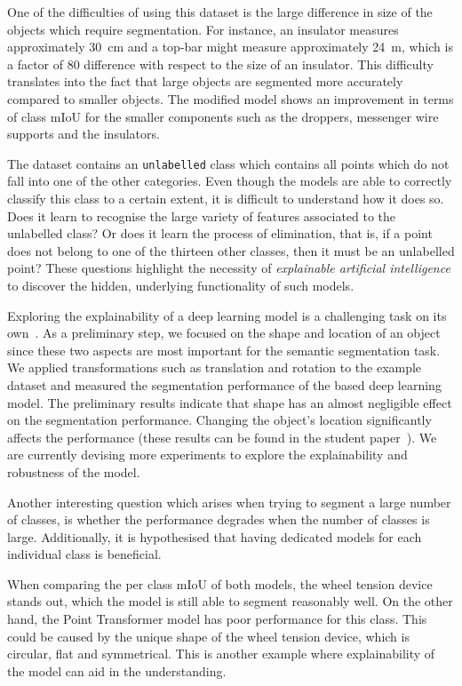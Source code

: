 One of the difficulties of using this dataset is the large difference in size of the objects which require segmentation. For instance, an insulator measures approximately 30~cm and a top-bar might measure approximately 24~m, which is a factor of 80 difference with respect to the size of an insulator. This difficulty translates into the fact that large objects are segmented more accurately compared to smaller objects. The modified \pnpp{} model shows an improvement in terms of class mIoU for the smaller components such as the droppers, messenger wire supports and the insulators. 

The dataset contains an \texttt{unlabelled} class which contains all points which do not fall into one of the other categories. Even though the models are able to correctly classify this class to a certain extent, it is difficult to understand how it does so. Does it learn to recognise the large variety of features associated to the unlabelled class? Or does it learn the process of elimination, that is, if a point does not belong to one of the thirteen other classes, then it must be an unlabelled point? These questions highlight the necessity of \emph{explainable artificial intelligence}\cite{Samek2019} to discover the hidden, underlying functionality of such models.

Exploring the explainability of a deep learning model is a challenging task on its own~\cite{linardatos2021explainable,pan20,pointhop20,bubbleEx22}. As a preliminary step, we focused on the shape and location of an object since these two aspects are most important for the semantic segmentation task. We applied transformations such as translation and rotation to the example dataset and measured the segmentation performance of the \pnpp{} based deep learning model. The preliminary results indicate that shape has an almost negligible effect on the segmentation performance. Changing the object's location significantly affects the performance (these results can be found in the student paper~\cite{verburg2022exploring}). We are currently devising more experiments to explore the explainability and robustness of the model. 

Another interesting question which arises when trying to segment a large number of classes, is whether the performance degrades when the number of classes is large. Additionally, it is hypothesised that having dedicated models for each individual class is beneficial.

When comparing the per class mIoU of both models, the wheel tension device stands out, which the \pnpp{} model is still able to segment reasonably well. On the other hand, the Point Transformer model has poor performance for this class. This could be caused by the unique shape of the wheel tension device, which is circular, flat and symmetrical. This is another example where explainability of the model can aid in the understanding.

